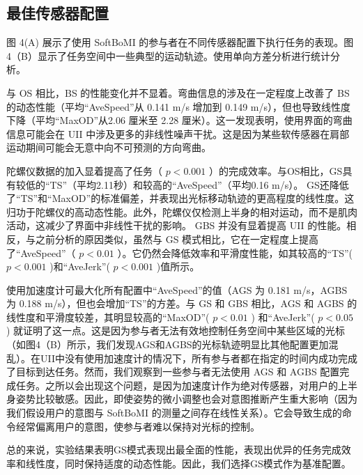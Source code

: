 \subsection{最佳传感器配置  }    图 4(A) 展示了使用 SoftBoMI 的参与者在不同传感器配置下执行任务的表现。图4（B）显示了任务空间中一些典型的运动轨迹。使用单向方差分析进行统计分析。  

与 OS 相比，BS 的性能变化并不显着。弯曲信息的涉及在一定程度上改善了 BS 的动态性能（平均“AveSpeed”从 0.141 m/s 增加到 0.149 m/s），但也导致线性度下降（平均“MaxOD”从2.06 厘米至 2.28 厘米）。这一发现表明，使用界面的弯曲信息可能会在 UII 中涉及更多的非线性噪声干扰。这是因为某些软传感器在肩部运动期间可能会无意中向不可预测的方向弯曲。  

陀螺仪数据的加入显着提高了任务（   $p<0.001$   ）的完成效率。与OS相比，GS具有较低的“TS”（平均2.11秒）和较高的“AveSpeed”（平均0.16 m/s）。 GS还降低了“TS”和“MaxOD”的标准偏差，并表现出光标移动轨迹的更高程度的线性度。这归功于陀螺仪的高动态性能。此外，陀螺仪仅检测上半身的相对运动，而不是肌肉活动，这减少了界面中非线性干扰的影响。 GBS 并没有显着提高 UII 的性能。相反，与之前分析的原因类似，虽然与 GS 模式相比，它在一定程度上提高了“AveSpeed”（   $p<0.01$   ）。它仍然会降低效率和平滑度性能，如其较高的“TS”(   $p<0.001$   )和“AveJerk”(   $p<0.001$   )值所示。  

使用加速度计可最大化所有配置中“AveSpeed”的值（AGS 为 0.181 m/s，AGBS 为 0.188 m/s），但也会增加“TS”的方差。与 GS 和 GBS 相比，AGS 和 AGBS 的线性度和平滑度较差，其明显较高的“MaxOD”(   $p<0.01$   ) 和“AveJerk”(   $p<0.05$   ) 就证明了这一点。这是因为参与者无法有效地控制任务空间中某些区域的光标（如图4（B）所示，我们发现AGS和AGBS的光标轨迹明显比其他配置更加混乱）。在UII中没有使用加速度计的情况下，所有参与者都在指定的时间内成功完成了目标到达任务。然而，我们观察到一些参与者无法使用 AGS 和 AGBS 配置完成任务。之所以会出现这个问题，是因为加速度计作为绝对传感器，对用户的上半身姿势比较敏感。因此，即使姿势的微小调整也会对意图推断产生重大影响（因为我们假设用户的意图与 SoftBoMI 的测量之间存在线性关系）。它会导致生成的命令经常偏离用户的意图，使参与者难以保持对光标的控制。  

总的来说，实验结果表明GS模式表现出最全面的性能，表现出优异的任务完成效率和线性度，同时保持适度的动态性能。因此，我们选择GS模式作为基准配置。  

